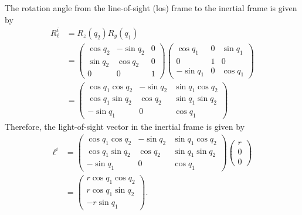 \documentclass{article}
\newcommand{\ellbf}{\boldsymbol{\ell}}
\begin{document}
The rotation angle from the line-of-sight (los) frame to the inertial frame is given by
\begin{align*}
R_\ell^i &= R_z(q_2)R_y(q_1) \\ 
		&= \begin{pmatrix}\cos q_2 & -\sin q_2 & 0 \\ \sin q_2 & \cos q_2 & 0 \\ 0 & 0 & 1 \end{pmatrix}
		   \begin{pmatrix}\cos q_1 & 0 & \sin q_1 \\ 0 & 1 & 0 \\ -\sin q_1 & 0 & \cos q_1 \end{pmatrix} \\
		 &= \begin{pmatrix} \cos q_1 \cos q_2 & -\sin q_2 & \sin q_1\cos q_2 \\ \cos q_1 \sin q_2 & \cos q_2 & \sin q_1 \sin q_2 \\ -\sin q_1 & 0 & \cos q_1 \end{pmatrix}
\end{align*}
Therefore, the light-of-sight vector in the inertial frame is given by
\begin{align*}
\ellbf^i &= \begin{pmatrix} \cos q_1 \cos q_2 & -\sin q_2 & \sin q_1\cos q_2 \\ \cos q_1 \sin q_2 & \cos q_2 & \sin q_1 \sin q_2 \\ -\sin q_1 & 0 & \cos q_1 \end{pmatrix}
		   \begin{pmatrix} r \\ 0 \\ 0 \end{pmatrix} \\
		 &= \begin{pmatrix} r\cos q_1 \cos q_2 \\ r \cos q_1 \sin q_2 \\ - r\sin q_1 \end{pmatrix}.
\end{align*}
\end{document}
